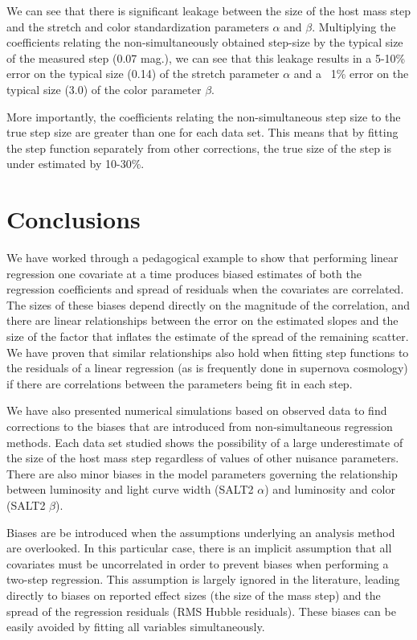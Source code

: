 We can see that there is significant leakage between the size of the host mass step and the stretch and color standardization parameters $\alpha$ and $\beta$. Multiplying the coefficients relating the non-simultaneously obtained step-size by the typical size of the measured step (0.07 mag.), we can see that this leakage results in a 5-10\% error on the typical size (0.14) of the stretch parameter $\alpha$ and a ~1\% error on the typical size (3.0) of the color parameter $\beta$.

More importantly, the coefficients relating the non-simultaneous step size to the true step size are greater than one for each data set. This means that by fitting the step function separately from other corrections, the true size of the step is under estimated by 10-30\%.

\section{Conclusions}
\label{sec:conclusion}
We have worked through a pedagogical example to show that performing linear regression one covariate at a time produces biased estimates of both the regression coefficients and spread of residuals when the covariates are correlated. The sizes of these biases depend directly on the magnitude of the correlation, and there are linear relationships between the error on the estimated slopes and the size of the factor that inflates the estimate of the spread of the remaining scatter. We have proven that similar relationships also hold when fitting step functions to the residuals of a linear regression (as is frequently done in supernova cosmology) if there are correlations between the parameters being fit in each step. 

We have also presented numerical simulations based on observed data to find corrections to the biases that are introduced from non-simultaneous regression methods. Each data set studied shows the possibility of a large underestimate of the size of the host mass step regardless of values of other nuisance parameters. There are also minor biases in the model parameters governing the relationship between luminosity and light curve width (SALT2 $\alpha$) and luminosity and color (SALT2 $\beta$).

Biases are be introduced when the assumptions underlying an analysis method are overlooked. In this particular case, there is an implicit assumption that all covariates must be uncorrelated in order to prevent biases when performing a two-step regression. This assumption is largely ignored in the literature, leading directly to biases on reported effect sizes (the size of the mass step) and the spread of the regression residuals (RMS Hubble residuals). These biases can be easily avoided by fitting all variables simultaneously.
